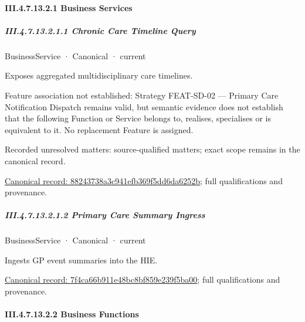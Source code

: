 \paragraph*{III.4.7.13.2.1 Business Services}
\label{navigation:III.4.7.13.2.1}

\subparagraph*{III.4.7.13.2.1.1 Chronic Care Timeline Query}
\label{navigation:III.4.7.13.2.1.1}

\label{element:88243738a3c941efb369f5dd6da6252b}
{\small BusinessService · Canonical · current}\par

Exposes aggregated multidisciplinary care timelines.



Feature association not established: Strategy FEAT-SD-02 — Primary Care Notification Dispatch remains valid, but semantic evidence does not establish that the following Function or Service belongs to, realises, specialises or is equivalent to it. No replacement Feature is assigned.


{\small Recorded unresolved matters: source-qualified matters; exact scope remains in the canonical record.}\par
{\footnotesize \href{../../../../../../../continuum/business/business-service/88243738a3c941efb369f5dd6da6252b.md}{Canonical record: 88243738a3c941efb369f5dd6da6252b}; full qualifications and provenance.}\par
\subparagraph*{III.4.7.13.2.1.2 Primary Care Summary Ingress}
\label{navigation:III.4.7.13.2.1.2}

\label{element:7f4ca66b911e48bc8bf859e239f5ba00}
{\small BusinessService · Canonical · current}\par

Ingests GP event summaries into the HIE.


{\footnotesize \href{../../../../../../../continuum/business/business-service/7f4ca66b911e48bc8bf859e239f5ba00.md}{Canonical record: 7f4ca66b911e48bc8bf859e239f5ba00}; full qualifications and provenance.}\par
\paragraph*{III.4.7.13.2.2 Business Functions}
\label{navigation:III.4.7.13.2.2}

